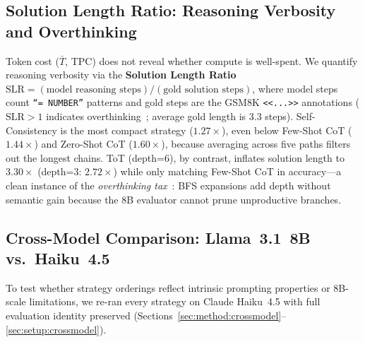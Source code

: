 \documentclass[conference]{IEEEtran}
\begin{document}
\subsection{Solution Length Ratio: Reasoning Verbosity and Overthinking}
\label{sec:results:slr}

Token cost ($\bar{T}$, TPC) does not reveal whether compute is
well-spent.
We quantify reasoning verbosity via the \textbf{Solution Length Ratio}
$\text{SLR} = (\text{model reasoning steps}) / (\text{gold solution
steps})$, where model steps count \texttt{``= NUMBER''} patterns and
gold steps are the GSM8K \texttt{<<...>>} annotations
($\text{SLR}{>}1$ indicates overthinking~\cite{wu2025whenmoreisless};
average gold length is 3.3 steps).
Self-Consistency is the most compact strategy ($1.27\times$), even
below Few-Shot CoT ($1.44\times$) and Zero-Shot CoT ($1.60\times$),
because averaging across five paths filters out the longest chains.
ToT (depth=6), by contrast, inflates solution length to $3.30\times$
(depth=3: $2.72\times$) while only matching Few-Shot CoT in
accuracy---a clean instance of the \textit{overthinking
tax}~\cite{wu2025whenmoreisless}: BFS expansions add depth without
semantic gain because the 8B evaluator cannot prune unproductive
branches.

\subsection{Cross-Model Comparison: Llama~3.1~8B vs.\ Haiku~4.5}
\label{sec:results:crossmodel}

To test whether strategy orderings reflect intrinsic prompting
properties or 8B-scale limitations, we re-ran every strategy on
Claude Haiku~4.5 with full evaluation identity preserved
(Sections~\ref{sec:method:crossmodel}--\ref{sec:setup:crossmodel}).
\end{document}
